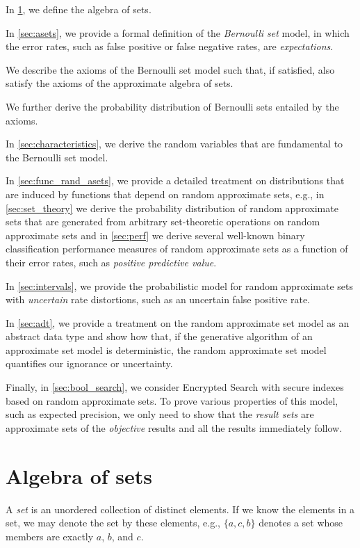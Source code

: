 \documentclass[10pt,final,hidelinks]{article}
\numberwithin{equation}{section}
\begin{document}
In \cref{sec:setalgebra}, we define the algebra of sets.

In \cref{sec:asets}, we provide a formal definition of the \emph{Bernoulli set} model, in which the error rates, such as false positive or false negative rates, are \emph{expectations}.

We describe the axioms of the Bernoulli set model such that, if satisfied, also satisfy the axioms of the approximate algebra of sets.

We further derive the probability distribution of Bernoulli sets entailed by the axioms.

In \cref{sec:characteristics}, we derive the random variables that are fundamental to the Bernoulli set model.

In \cref{sec:func_rand_asets}, we provide a detailed treatment on distributions that are induced by functions that depend on random approximate sets, e.g., in \cref{sec:set_theory} we derive the probability distribution of random approximate sets that are generated from arbitrary set-theoretic operations on random approximate sets and in \cref{sec:perf} we derive several well-known binary classification performance measures of random approximate sets as a function of their error rates, such as \emph{positive predictive value}.

In \cref{sec:intervals}, we provide the probabilistic model for random approximate sets with \emph{uncertain} rate distortions, such as an uncertain false positive rate.

In \cref{sec:adt}, we provide a treatment on the random approximate set model as an abstract data type and show how that, if the generative algorithm of an approximate set model is deterministic, the random approximate set model quantifies our ignorance or uncertainty.

Finally, in \cref{sec:bool_search}, we consider Encrypted Search with secure indexes based on random approximate sets.
To prove various properties of this model, such as expected precision, we only need to show that the \emph{result sets} are approximate sets of the \emph{objective} results and all the results immediately follow.

\providecommand{\mainx}{..}
\section{Algebra of sets} 
\label{sec:setalgebra}
A \emph{set} is an unordered collection of distinct elements.
If we know the elements in a set, we may denote the set by these elements, e.g., $\{a,c,b\}$ denotes a set whose members are exactly $a$, $b$, and $c$.
\end{document}
